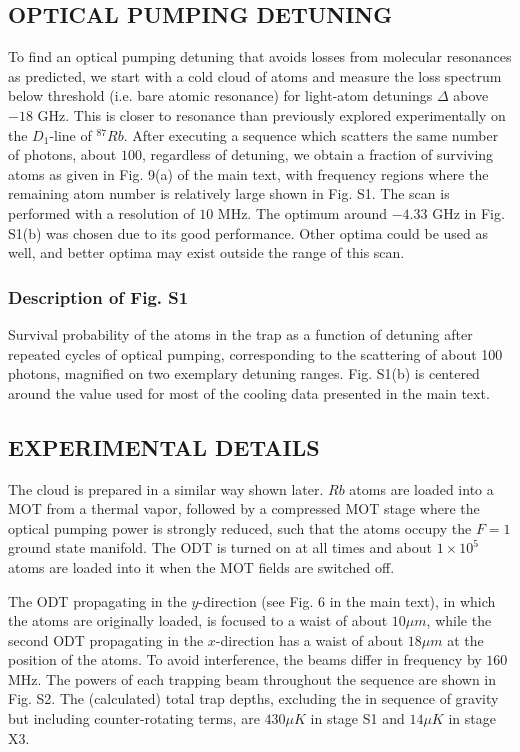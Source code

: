 \documentclass{article}
\begin{document}
\subsection{OPTICAL PUMPING DETUNING}
To find an optical pumping detuning that avoids losses from molecular resonances as predicted, we start with a cold cloud of atoms and measure the loss spectrum below threshold (i.e. bare atomic resonance) for light-atom detunings $\Delta$ above $-18$ GHz. This is closer to resonance than previously explored experimentally on the $D_1$-line of $^{87}Rb$. After executing a sequence which scatters the same number of photons, about $100$, regardless of detuning, we obtain a fraction of surviving atoms as given in Fig. 9(a) of the main text, with frequency regions where the remaining atom number is relatively large shown in Fig. S1. The scan is performed with a resolution of $10$ MHz. The optimum around $-4.33$ GHz in Fig. S1(b) was chosen due to its good performance. Other optima could be used as well, and better optima may exist outside the range of this scan.

\subsubsection{Description of Fig. S1}
Survival probability of the atoms in the trap as a function of detuning after repeated cycles of optical pumping, corresponding to the scattering of about 100 photons, magnified on two exemplary detuning ranges. Fig. S1(b) is centered around the value used for most of the cooling data presented in the main text.

\subsection{EXPERIMENTAL DETAILS}
The cloud is prepared in a similar way shown later. $Rb$ atoms are loaded into a MOT from a thermal vapor, followed by a compressed MOT stage where the optical pumping power is strongly reduced, such that the atoms occupy the $F = 1$ ground state manifold. The ODT is turned on at all times and about $1\times10^5$ atoms are loaded into it when the MOT fields are switched off.

The ODT propagating in the $y$-direction (see Fig. 6 in the main text), in which the atoms are originally loaded, is focused to a waist of about $10 \mu m$, while the second ODT propagating in the $x$-direction has a waist of about $18 \mu m$ at the position of the atoms. To avoid interference, the beams differ in frequency by $160$ MHz. The powers of each trapping beam throughout the sequence are shown in Fig. S2. The (calculated) total trap depths, excluding the in sequence of gravity but including counter-rotating terms, are $430 \mu K$ in stage S1 and $14 \mu K$ in stage X3. 
\end{document}
